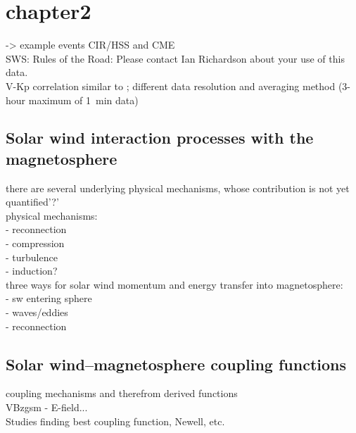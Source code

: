 \chapter{chapter2}


-> example events CIR/HSS and CME\\

SWS: Rules of the Road: Please contact Ian Richardson about your use of this data.\\

V-Kp correlation similar to \citet{Elliott2013}; different data resolution and averaging method (3-hour maximum of 1~min data)


\section{Solar wind interaction processes with the magnetosphere}
there are several underlying physical mechanisms, whose contribution is not yet quantified'?'\\
physical mechanisms:\\
- reconnection\\
- compression\\
- turbulence\\
- induction?\\

three ways for solar wind momentum and energy transfer into magnetosphere:\\
- sw entering sphere\\
- waves/eddies\\
- reconnection\\


\section{Solar wind--magnetosphere coupling functions}
coupling mechanisms and therefrom derived functions\\
VBzgsm - E-field...\\

Studies finding best coupling function, Newell, etc.\\

